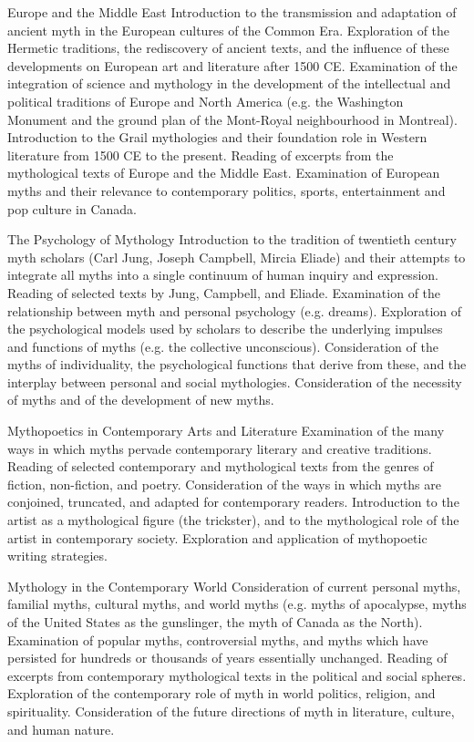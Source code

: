 \documentclass[letterpaper,10pt,headsepline]{scrreprt}
\begin{document}
\begin{compactdesc}
\item[Europe and the Middle East]
Introduction to the transmission and adaptation of ancient myth in the European cultures of the Common Era.
Exploration of the Hermetic traditions, the rediscovery of ancient texts, and the influence of these developments on European art and literature after 1500 CE.
Examination of the integration of science and mythology in the development of the intellectual and political traditions of Europe and North America (e.g. the Washington Monument and the ground plan of the Mont-Royal neighbourhood in Montreal).
Introduction to the Grail mythologies and their foundation role in Western literature from 1500 CE to the present.
Reading of excerpts from the mythological texts of Europe and the Middle East.
Examination of European myths and their relevance to contemporary politics, sports, entertainment and pop culture in Canada.\\

\item[The Psychology of Mythology]
Introduction to the tradition of twentieth century myth scholars (Carl Jung, Joseph Campbell, Mircia Eliade) and their attempts to integrate all myths into a single continuum of human inquiry and expression.
Reading of selected texts by Jung, Campbell, and Eliade.
Examination of the relationship between myth and personal psychology (e.g. dreams).
Exploration of the psychological models used by scholars to describe the underlying impulses and functions of myths (e.g. the collective unconscious).
Consideration of the myths of individuality, the psychological
functions that derive from these, and the interplay between personal
and social mythologies. Consideration of the necessity of myths and of the development of new myths.\\

\item[Mythopoetics in Contemporary Arts and Literature]
Examination of the many ways in which myths pervade contemporary literary and creative traditions.
Reading of selected contemporary and mythological texts from the genres of fiction, non-fiction, and poetry.
Consideration of the ways in which myths are conjoined, truncated, and adapted for contemporary readers.
Introduction to the artist as a mythological figure (the trickster), and to the mythological role of the artist in contemporary society.
Exploration and application of mythopoetic writing strategies.\\

\item[Mythology in the Contemporary World]
Consideration of current personal myths, familial myths, cultural myths, and world myths (e.g. myths of apocalypse, myths of the United States as the gunslinger, the myth of Canada as the North).
Examination of popular myths, controversial myths, and myths which have persisted for hundreds or thousands of years essentially unchanged.
Reading of excerpts from contemporary mythological texts in the political and social spheres.
Exploration of the contemporary role of myth in world politics, religion, and spirituality.
Consideration of the future directions of myth in literature, culture, and human nature.\\


\end{compactdesc}
\end{document}

